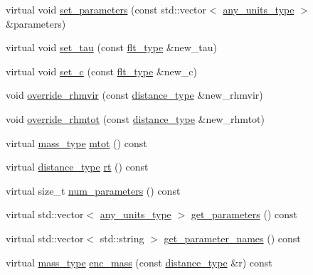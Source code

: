 \begin{DoxyCompactItemize}
\item 
virtual void \hyperlink{classIceBRG_1_1density__profile_af58ebb218c2abe35cfaa261cd29ba35c}{set\+\_\+parameters} (const std\+::vector$<$ \hyperlink{namespaceIceBRG_a3101fc159e191fa99c4ec14e445df96e}{any\+\_\+units\+\_\+type} $>$ \&parameters)
\item 
virtual void \hyperlink{classIceBRG_1_1density__profile_ac555b90ef308964a086b94aff857c0ea}{set\+\_\+tau} (const \hyperlink{lib_2IceBRG__main_2common_8h_ad0f130a56eeb944d9ef2692ee881ecc4}{flt\+\_\+type} \&new\+\_\+tau)
\item 
virtual void \hyperlink{classIceBRG_1_1density__profile_a667b94f29c17889c6e987e39ecacd8ad}{set\+\_\+c} (const \hyperlink{lib_2IceBRG__main_2common_8h_ad0f130a56eeb944d9ef2692ee881ecc4}{flt\+\_\+type} \&new\+\_\+c)
\item 
void \hyperlink{classIceBRG_1_1density__profile_aaf60b6259f530a6beb6424723d89b4b0}{override\+\_\+rhmvir} (const \hyperlink{namespaceIceBRG_a45499647eb87e24c10ab32c628711cec}{distance\+\_\+type} \&new\+\_\+rhmvir)
\item 
void \hyperlink{classIceBRG_1_1density__profile_a8e1f443d0b47285bd0342f101d2148d9}{override\+\_\+rhmtot} (const \hyperlink{namespaceIceBRG_a45499647eb87e24c10ab32c628711cec}{distance\+\_\+type} \&new\+\_\+rhmtot)
\item 
virtual \hyperlink{namespaceIceBRG_a1be72ac4918a9b029f2eefa084213e35}{mass\+\_\+type} \hyperlink{classIceBRG_1_1density__profile_ada763e0637edc2efb168a9fa42daa580}{mtot} () const 
\item 
virtual \hyperlink{namespaceIceBRG_a45499647eb87e24c10ab32c628711cec}{distance\+\_\+type} \hyperlink{classIceBRG_1_1density__profile_a53c528b9d6de8506175faece58361c23}{rt} () const 
\item 
virtual size\+\_\+t \hyperlink{classIceBRG_1_1density__profile_ad63fb55be18802ec2ab1d4a0a9d49236}{num\+\_\+parameters} () const 
\item 
virtual std\+::vector$<$ \hyperlink{namespaceIceBRG_a3101fc159e191fa99c4ec14e445df96e}{any\+\_\+units\+\_\+type} $>$ \hyperlink{classIceBRG_1_1density__profile_a661c4e91260285e70290c8b454a0f0d9}{get\+\_\+parameters} () const 
\item 
virtual std\+::vector$<$ std\+::string $>$ \hyperlink{classIceBRG_1_1density__profile_ae773cdab093dfc22ff9dc01dd2de09f4}{get\+\_\+parameter\+\_\+names} () const 
\item 
virtual \hyperlink{namespaceIceBRG_a1be72ac4918a9b029f2eefa084213e35}{mass\+\_\+type} \hyperlink{classIceBRG_1_1density__profile_a090e214c2228f99019c75e7fede37ae5}{enc\+\_\+mass} (const \hyperlink{namespaceIceBRG_a45499647eb87e24c10ab32c628711cec}{distance\+\_\+type} \&r) const 

\end{DoxyCompactItemize}
